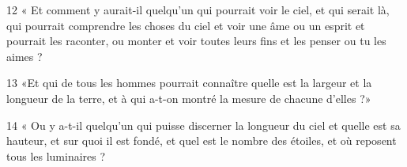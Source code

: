 \par 12 « Et comment y aurait-il quelqu'un qui pourrait voir le ciel, et qui serait là, qui pourrait comprendre les choses du ciel et voir une âme ou un esprit et pourrait les raconter, ou monter et voir toutes leurs fins et les penser ou tu les aimes ?
\par 13 «Et qui de tous les hommes pourrait connaître quelle est la largeur et la longueur de la terre, et à qui a-t-on montré la mesure de chacune d'elles ?»
\par 14 « Ou y a-t-il quelqu'un qui puisse discerner la longueur du ciel et quelle est sa hauteur, et sur quoi il est fondé, et quel est le nombre des étoiles, et où reposent tous les luminaires ?




